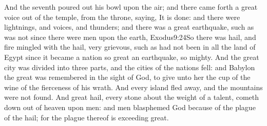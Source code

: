 And the seventh poured out his bowl upon the air; and there came forth a great voice out of the temple,%
 from the throne, saying, It is done: 
and there were lightnings, and voices, and thunders; and there was a great earthquake, such as was not since there were men upon the earth,%
					{Exodus}{9:24}{So there was hail, and fire mingled with the hail, very grievous, such as had not been in all the land of Egypt since it became a nation}
 so great an earthquake, so mighty. 
And the great city was divided into three parts, and the cities of the nations fell: and Babylon the great was remembered in the sight of God, to give unto her the cup of the wine of the fierceness of his wrath. 
And every island fled away, and the mountains were not found. 
And great hail, every stone about the weight of a talent, cometh down out of heaven upon men: and men blasphemed God because of the plague of the hail; for the plague thereof is exceeding great.

